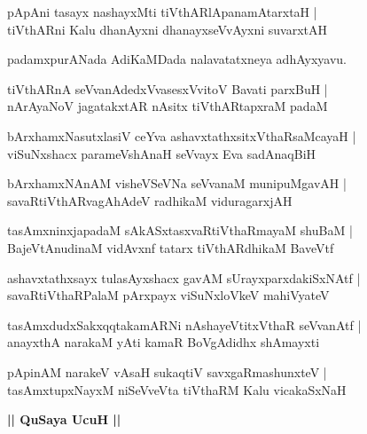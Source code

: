 \documentclass[twoside,12pt,openright]{book}
\newcounter{shloka}[chapter]
\def\uvaca#1{\centerline{{\large\textbf{#1}}}}
\begin{document}
\begin{shloka}
pApAni tasayx nashayxMti tiVthARlApanamAtarxtaH |\\
tiVthARni Kalu dhanAyxni dhanayxseVvAyxni suvarxtAH 
\end{shloka}

\begin{center}
padamxpurANada AdiKaMDada nalavatatxneya adhAyxyavu. 
\end{center}

\begin{shloka}
tiVthARnA seVvanAdedxVvasesxVvitoV Bavati parxBuH |\\
nArAyaNoV jagatakxtAR nAsitx tiVthARtapxraM padaM 
\end{shloka}

\begin{shloka}
bArxhamxNasutxlasiV ceYva ashavxtathxsitxVthaRsaMcayaH |\\
viSuNxshacx parameVshAnaH seVvayx Eva sadAnaqBiH 
\end{shloka}

\begin{shloka}
bArxhamxNAnAM visheVSeVNa seVvanaM munipuMgavAH |\\
savaRtiVthARvagAhAdeV radhikaM viduragarxjAH 
\end{shloka}

\begin{shloka}
tasAmxninxjapadaM sAkASxtasxvaRtiVthaRmayaM shuBaM |\\
BajeVtAnudinaM vidAvxnf tatarx tiVthARdhikaM BaveVtf 
\end{shloka}

\begin{shloka}
ashavxtathxsayx tulasAyxshacx gavAM sUrayxparxdakiSxNAtf |\\
savaRtiVthaRPalaM pArxpayx viSuNxloVkeV mahiVyateV 
\end{shloka}

\begin{shloka}
tasAmxdudxSakxqqtakamARNi nAshayeVtitxVthaR seVvanAtf |\\
anayxthA narakaM yAti kamaR BoVgAdidhx shAmayxti 
\end{shloka}

\begin{shloka}
pApinAM narakeV vAsaH sukaqtiV savxgaRmashunxteV |\\
tasAmxtupxNayxM niSeVveVta tiVthaRM Kalu vicakaSxNaH 
\end{shloka}

\uvaca{|| QuSaya UcuH ||}
\end{document}
